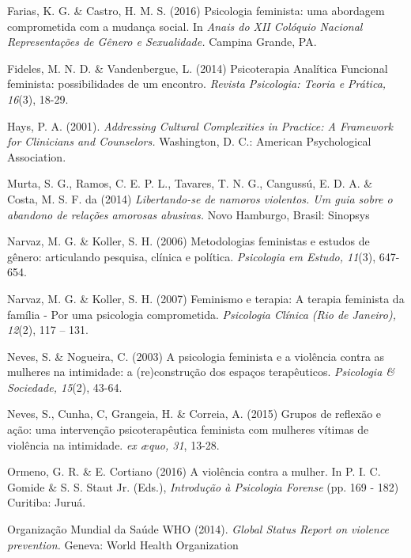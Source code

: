 \hangindent=25pt
\noindent Farias, K. G. \& Castro, H. M. S. (2016) Psicologia feminista: uma abordagem comprometida com a mudança social. In \textit{Anais do XII Colóquio Nacional Representações de Gênero e Sexualidade.} Campina Grande, PA.

\hangindent=25pt
\noindent Fideles, M. N. D. \& Vandenbergue, L. (2014) Psicoterapia Analítica Funcional feminista: possibilidades de um encontro. \textit{Revista Psicologia: Teoria e Prática, 16}(3), 18-29. 

\hangindent=25pt
\noindent Hays, P. A. (2001). \textit{Addressing Cultural Complexities in Practice: A Framework for Clinicians and Counselors.} Washington, D. C.: American Psychological Association.

\hangindent=25pt
\noindent Murta, S. G., Ramos, C. E. P. L., Tavares, T. N. G., Cangussú, E. D. A. \& Costa, M. S. F. da (2014) \textit{Libertando-se de namoros violentos. Um guia sobre o abandono de relações amorosas abusivas.} Novo Hamburgo, Brasil: Sinopsys

\hangindent=25pt
\noindent Narvaz, M. G. \& Koller, S. H. (2006) Metodologias feministas e estudos de gênero: articulando pesquisa, clínica e política. \textit{Psicologia em Estudo, 11}(3), 647-654.

\hangindent=25pt
\noindent Narvaz, M. G. \& Koller, S. H. (2007) Feminismo e terapia: A terapia feminista da família - Por uma psicologia comprometida. \textit{Psicologia Clínica (Rio de Janeiro), 12}(2), 117 – 131.

\hangindent=25pt
\noindent Neves, S. \& Nogueira, C. (2003) A psicologia feminista e a violência contra as mulheres na intimidade: a (re)construção dos espaços terapêuticos. \textit{Psicologia \& Sociedade, 15}(2), 43-64.

\hangindent=25pt
\noindent Neves, S., Cunha, C, Grangeia, H. \& Correia, A. (2015) Grupos de reflexão e ação: uma intervenção psicoterapêutica feminista com mulheres vítimas de violência na intimidade. \textit{ex æquo, 31}, 13-28.

\hangindent=25pt
\noindent Ormeno, G. R. \& E. Cortiano (2016) A violência contra a mulher. In P. I. C. Gomide \& S. S. Staut Jr. (Eds.), \textit{Introdução à Psicologia Forense} (pp. 169 - 182) Curitiba: Juruá.

\hangindent=25pt
\noindent Organização Mundial da Saúde WHO (2014). \textit{Global Status Report on violence prevention.} Geneva: World Health Organization

